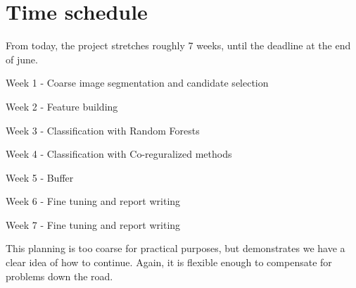 \documentclass[a4paper, 10pt, english, onecolumn]{article}
\newenvironment{packed_item}{
\begin{itemize}
  \setlength{\itemsep}{1pt}
  \setlength{\parskip}{0pt}
  \setlength{\parsep}{0pt}
}{\end{itemize}}
\begin{document}
\section{Time schedule}
From today, the project stretches roughly 7 weeks, until the deadline at the end of june.

\begin{packed_item}
  \item Week 1 - Coarse image segmentation and candidate selection
  \item Week 2 - Feature building
  \item Week 3 - Classification with Random Forests
  \item Week 4 - Classification with Co-reguralized methods
  \item Week 5 - Buffer
  \item Week 6 - Fine tuning and report writing
  \item Week 7 - Fine tuning and report writing
\end{packed_item}

This planning is too coarse for practical purposes, but demonstrates we have a clear idea of how to continue.
Again, it is flexible enough to compensate for problems down the road.

{}

\end{document}

